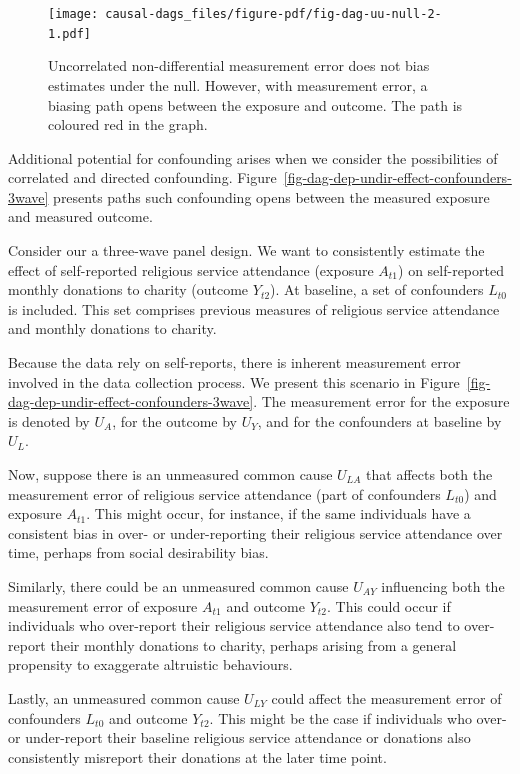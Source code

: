 \documentclass[
  singlecolumn]{report}
\begin{document}
\begin{figure}

{\centering \texttt{[image: causal-dags\_files/figure-pdf/fig-dag-uu-null-2-1.pdf]}

}

\caption{\label{fig-dag-uu-null-2}Uncorrelated non-differential
measurement error does not bias estimates under the null. However, with
measurement error, a biasing path opens between the exposure and
outcome. The path is coloured red in the graph.}

\end{figure}

Additional potential for confounding arises when we consider the
possibilities of correlated and directed confounding.
Figure~\ref{fig-dag-dep-undir-effect-confounders-3wave} presents paths
such confounding opens between the measured exposure and measured
outcome.

Consider our a three-wave panel design. We want to consistently estimate
the effect of self-reported religious service attendance (exposure
\(A_{t1}\)) on self-reported monthly donations to charity (outcome
\(Y_{t2}\)). At baseline, a set of confounders \(L_{t0}\) is included.
This set comprises previous measures of religious service attendance and
monthly donations to charity.

Because the data rely on self-reports, there is inherent measurement
error involved in the data collection process. We present this scenario
in Figure~\ref{fig-dag-dep-undir-effect-confounders-3wave}. The
measurement error for the exposure is denoted by \(U_A\), for the
outcome by \(U_Y\), and for the confounders at baseline by \(U_L\).

Now, suppose there is an unmeasured common cause \(U_{LA}\) that affects
both the measurement error of religious service attendance (part of
confounders \(L_{t0}\)) and exposure \(A_{t1}\). This might occur, for
instance, if the same individuals have a consistent bias in over- or
under-reporting their religious service attendance over time, perhaps
from social desirability bias.

Similarly, there could be an unmeasured common cause \(U_{AY}\)
influencing both the measurement error of exposure \(A_{t1}\) and
outcome \(Y_{t2}\). This could occur if individuals who over-report
their religious service attendance also tend to over-report their
monthly donations to charity, perhaps arising from a general propensity
to exaggerate altruistic behaviours.

Lastly, an unmeasured common cause \(U_{LY}\) could affect the
measurement error of confounders \(L_{t0}\) and outcome \(Y_{t2}\). This
might be the case if individuals who over- or under-report their
baseline religious service attendance or donations also consistently
misreport their donations at the later time point.
\end{document}
